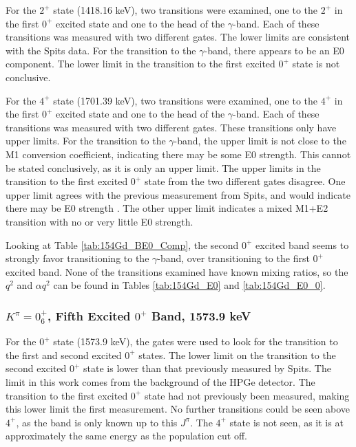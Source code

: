 For the $2^+$ state (1418.16 keV), two transitions were examined, one to the $2^+$ in the first $0^+$ excited state and one to the head of the $\gamma$-band. Each of these transitions was measured with two different gates. The lower limits are consistent with the Spits data. For the transition to the $\gamma$-band, there appears to be an E0 component. The lower limit in the transition to the first excited $0^+$ state is not conclusive.

For the $4^+$ state (1701.39 keV), two transitions were examined, one to the $4^+$ in the first $0^+$ excited state and one to the head of the $\gamma$-band. Each of these transitions was measured with two different gates. These transitions only have upper limits. For the transition to the $\gamma$-band, the upper limit is not close to the M1 conversion coefficient, indicating there may be some E0 strength. This cannot be stated conclusively, as it is only an upper limit. The upper limits in the transition to the first excited $0^+$ state from the two different gates disagree. One upper limit agrees with the previous measurement from Spits, and would indicate there may be E0 strength \citep{spits96:_154gd}. The other upper limit indicates a mixed M1+E2 transition with no or very little E0 strength.

Looking at Table \ref{tab:154Gd_BE0_Comp}, the second $0^+$ excited band seems to strongly favor transitioning to the $\gamma$-band, over transitioning to the first $0^+$ excited band. None of the transitions examined have known mixing ratios, so the $q^2$ and $\alpha q^2$ can be found in Tables \ref{tab:154Gd_E0} and \ref{tab:154Gd_E0_0}. 

\subsubsection{$K^{\pi}=0^+_6$, Fifth Excited $0^+$ Band, 1573.9 keV}

For the $0^+$ state (1573.9 keV), the gates were used to look for the transition to the first and second excited $0^+$ states. The lower limit on the transition to the second excited $0^+$ state is lower than that previously measured by Spits. The limit in this work comes from the background of the HPGe detector.  The transition to the first excited $0^+$ state had not previously been measured, making this lower limit the first measurement. No further transitions could be seen above $4^+$, as the band is only known up to this $J^{\pi}$. The $4^+$ state is not seen, as it is at approximately the same energy as the population cut off.

